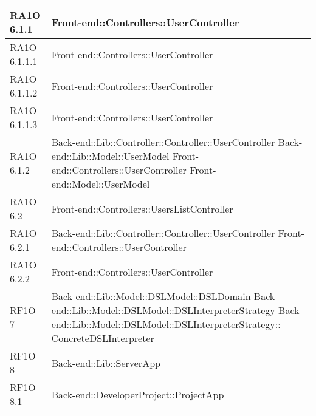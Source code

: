 \begin{center}
\begin{longtable}{ | p{4cm} | p{10cm} | }
    RA1O 6.1.1 & Front-end::Controllers::UserController \newline  \\ \hline     
     
    RA1O 6.1.1.1 & Front-end::Controllers::UserController \newline  \\ \hline
        
    RA1O 6.1.1.2 & Front-end::Controllers::UserController \newline  \\ \hline
        
    RA1O 6.1.1.3 & Front-end::Controllers::UserController \newline  \\ \hline
       
    RA1O 6.1.2 & Back-end::Lib::Controller::Controller::UserController \newline Back-end::Lib::Model::UserModel \newline Front-end::Controllers::UserController \newline Front-end::Model::UserModel \newline  \\ \hline     
    
    
    RA1O 6.2 & Front-end::Controllers::UsersListController  \\ \hline     
     
    RA1O 6.2.1 & Back-end::Lib::Controller::Controller::UserController \newline Front-end::Controllers::UserController \newline  \\ \hline      
    RA1O 6.2.2 & Front-end::Controllers::UserController \newline  \\ \hline      
      
    RF1O 7 & Back-end::Lib::Model::DSLModel::DSLDomain \newline Back-end::Lib::Model::DSLModel::DSLInterpreterStrategy \newline Back-end::Lib::Model::DSLModel::DSLInterpreterStrategy:: \newline ConcreteDSLInterpreter  \\ \hline      
    
    RF1O 8 & Back-end::Lib::ServerApp \newline  \\ \hline   
       
    RF1O 8.1  & Back-end::DeveloperProject::ProjectApp \newline  \\ \hline  
        

\end{longtable}
\end{center}
